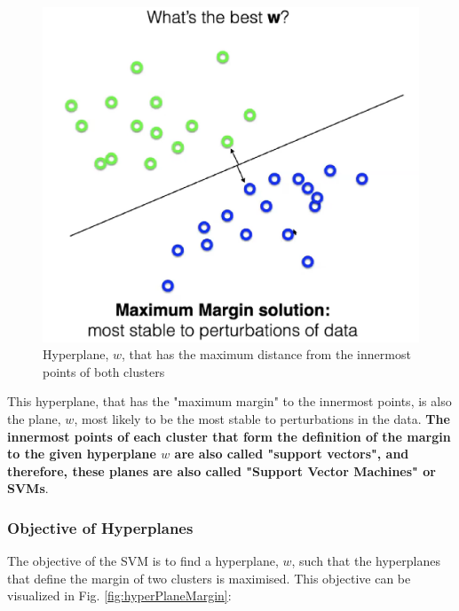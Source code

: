 \documentclass[11pt]{article}
\begin{document}
\begin{figure}[h]
    \centering
    \includegraphics[scale = 0.25]{figures/maxMargin.png}
    \caption{Hyperplane, $w$, that has the maximum distance from the innermost points of both clusters}
    \label{fig:maxMargin}
\end{figure}

This hyperplane, that has the "maximum margin" to the innermost points, is also the plane, $w$, most likely to be the most stable to perturbations in the data. \textbf{The innermost points of each cluster that form the definition of the margin to the given hyperplane $w$ are also called "support vectors", and therefore, these planes are also called "Support Vector Machines" or SVMs}.

\subsubsection{Objective of Hyperplanes}

The objective of the SVM is to find a hyperplane, $w$, such that the hyperplanes that define the margin of two clusters is maximised. This objective can be visualized in Fig. \ref{fig:hyperPlaneMargin}:
\end{document}
